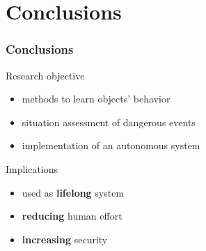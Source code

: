 \section{Conclusions}

\begin{frame}
	\frametitle{Conclusions}
	
	Research objective
	
	\begin{itemize}
		\item methods to learn objects' behavior
		\item situation assessment of dangerous events
		\item implementation of an autonomous system
	\end{itemize}
	
	\vspace{0.6cm}
	
	Implications
	
	\begin{itemize}
		\item used as \textbf{lifelong} system
		\item \textbf{reducing} human effort
		\item \textbf{increasing} security
	\end{itemize}
\end{frame}
